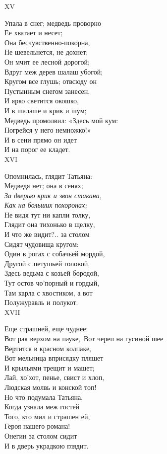 XV

Упала в снег; медведь проворно\\
Ее хватает и несет;\\
Она бесчувственно-покорна,\\
Не шевельнется, не дохнет;\\
Он мчит ее лесной дорогой;\\
Вдруг меж дерев шалаш убогой;\\
Кругом все глушь; отвсюду он\\
Пустынным снегом занесен,\\
И ярко светится окошко,\\
И в шалаше и крик и шум;\\
Медведь промолвил: «Здесь мой кум:\\
Погрейся у него немножко!»\\
И в сени прямо он идет\\
И на порог ее кладет.\\

XVI

Опомнилась, глядит Татьяна:\\
Медведя нет; она в сенях;\\
\emph{За дверью крик и звон стакана,\\
Как на больших похоронах;}\\
Не видя тут ни капли толку,\\
Глядит она тихонько в щелку,\\
И что же видит?.. за столом\\
Сидят чудовища кругом:\\
Один в рогах с собачьей мордой,\\
Другой с петушьей головой,\\
Здесь ведьма с козьей бородой,\\
Тут остов чо'порный и гордый,\\
Там карла с хвостиком, а вот\\
Полужуравль и полукот.\\

XVII

Еще страшней, еще чуднее:\\
Вот рак верхом на пауке,\
Вот череп на гусиной шее\\
Вертится в красном колпаке,\\
Вот мельница вприсядку пляшет\\
И крыльями трещит и машет;\\
Лай, хо'хот, пенье, свист и хлоп,\\
Людская молвь и конской топ!\\
Но что подумала Татьяна,\\
Когда узнала меж гостей\\
Того, кто мил и страшен ей,\\
Героя нашего романа!\\
Онегин за столом сидит\\
И в дверь украдкою глядит.\\

